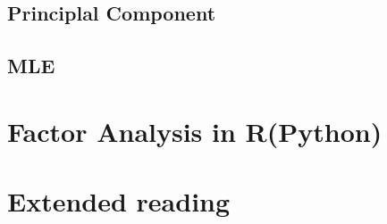 \documentclass{beamer}
\begin{document}
\subsection{Principlal Component}
\begin{frame}
\end{frame}
\begin{frame}
\end{frame}
\subsection{MLE}
\begin{frame}
\end{frame}
\begin{frame}
\end{frame}
\section{Factor Analysis in R(Python)}
\begin{frame}
\end{frame}
\begin{frame}
\end{frame}
\section{Extended reading}
\begin{frame}
\end{frame}
\begin{frame}
\end{frame}
\end{document}
